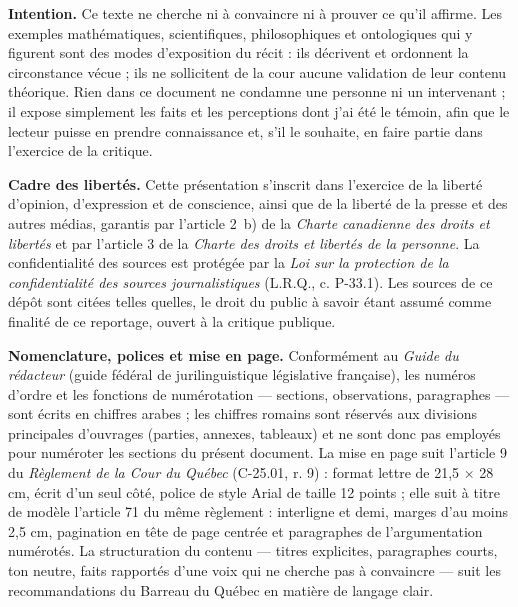 \documentclass[12pt,letterpaper,oneside]{article}
\begin{document}
\textbf{Intention.} Ce texte ne cherche ni à convaincre ni à prouver ce qu'il affirme. Les exemples mathématiques, scientifiques, philosophiques et ontologiques qui y figurent sont des modes d'exposition du récit : ils décrivent et ordonnent la circonstance vécue ; ils ne sollicitent de la cour aucune validation de leur contenu théorique. Rien dans ce document ne condamne une personne ni un intervenant ; il expose simplement les faits et les perceptions dont j'ai été le témoin, afin que le lecteur puisse en prendre connaissance et, s'il le souhaite, en faire partie dans l'exercice de la critique.

\textbf{Cadre des libertés.} Cette présentation s'inscrit dans l'exercice de la liberté d'opinion, d'expression et de conscience, ainsi que de la liberté de la presse et des autres médias, garantis par l'article 2~b) de la \textit{Charte canadienne des droits et libertés} et par l'article 3 de la \textit{Charte des droits et libertés de la personne}. La confidentialité des sources est protégée par la \textit{Loi sur la protection de la confidentialité des sources journalistiques} (L.R.Q., c. P-33.1). Les sources de ce dépôt sont citées telles quelles, le droit du public à savoir étant assumé comme finalité de ce reportage, ouvert à la critique publique.

\textbf{Nomenclature, polices et mise en page.} Conformément au \textit{Guide du rédacteur} (guide fédéral de jurilinguistique législative française), les numéros d'ordre et les fonctions de numérotation — sections, observations, paragraphes — sont écrits en chiffres arabes ; les chiffres romains sont réservés aux divisions principales d'ouvrages (parties, annexes, tableaux) et ne sont donc pas employés pour numéroter les sections du présent document. La mise en page suit l'article 9 du \textit{Règlement de la Cour du Québec} (C-25.01, r. 9) : format lettre de 21,5 × 28 cm, écrit d'un seul côté, police de style Arial de taille 12 points ; elle suit à titre de modèle l'article 71 du même règlement : interligne et demi, marges d'au moins 2,5 cm, pagination en tête de page centrée et paragraphes de l'argumentation numérotés. La structuration du contenu — titres explicites, paragraphes courts, ton neutre, faits rapportés d'une voix qui ne cherche pas à convaincre — suit les recommandations du Barreau du Québec en matière de langage clair.
\end{document}
